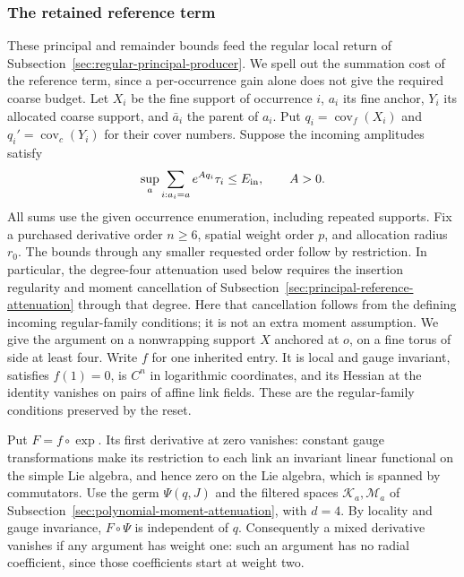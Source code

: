 \subsubsection{The retained reference term}
These principal and remainder bounds feed the regular local return
of Subsection~\ref{sec:regular-principal-producer}.
We spell out the summation cost of the reference term, since a
per-occurrence gain alone does not give the required coarse budget.
Let $X_i$ be the fine support of occurrence $i$, $a_i$ its fine anchor,
$Y_i$ its allocated coarse support, and $\bar a_i$ the parent of $a_i$.
Put $q_i=\operatorname{cov}_f(X_i)$ and
$q_i'=\operatorname{cov}_c(Y_i)$ for their cover numbers. Suppose the
incoming amplitudes satisfy
\begin{equation}\label{eq:singleton-incoming-budget}
 \sup_a\sum_{i:a_i=a}e^{Aq_i}\tau_i\le E_{\rm in},
                         \qquad A>0.
\end{equation}
All sums use the given occurrence enumeration, including repeated
supports. Fix a purchased derivative order $n\ge6$, spatial weight order
$p$, and allocation radius $r_0$. The bounds through any smaller requested
order follow by restriction. In particular, the degree-four attenuation
used below requires the insertion regularity and moment cancellation of
Subsection~\ref{sec:principal-reference-attenuation} through that degree.
Here that cancellation follows from the defining incoming regular-family
conditions; it is not an extra moment assumption. We give the argument
on a nonwrapping support $X$ anchored at $o$, on a fine torus of side
at least four. Write $f$ for one inherited entry. It is local and gauge
invariant, satisfies $f(1)=0$, is $C^n$ in logarithmic coordinates,
and its Hessian at the identity vanishes on pairs of affine link
fields. These are the regular-family conditions preserved by the reset.

Put $F=f\circ\exp$. Its first derivative at zero vanishes: constant
gauge transformations make its restriction to each link an invariant
linear functional on the simple Lie algebra, and hence zero on the
Lie algebra, which is spanned by commutators. Use the germ $\Psi(q,J)$
and the filtered spaces $\mathcal K_a,\mathcal M_a$ of
Subsection~\ref{sec:polynomial-moment-attenuation}, with $d=4$.
By locality and gauge invariance, $F\circ\Psi$ is independent of $q$.
Consequently a mixed derivative vanishes if any argument has weight
one: such an argument has no radial coefficient, since those
coefficients start at weight two.

